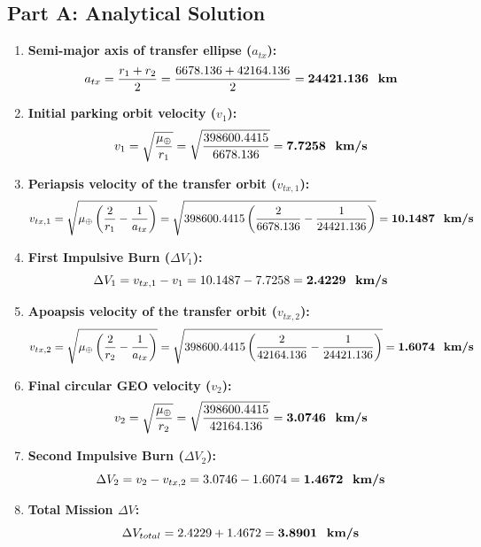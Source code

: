\documentclass[12pt]{article}
\begin{document}
\subsection*{Part A: Analytical Solution}
\begin{enumerate}
    \item \textbf{Semi-major axis of transfer ellipse ($a_{tx}$):}
    \begin{equation*}
        a_{tx} = \frac{r_1 + r_2}{2} = \frac{6678.136 + 42164.136}{2} = \textbf{24421.136 \text{ km}}
    \end{equation*}

    \item \textbf{Initial parking orbit velocity ($v_1$):}
    \begin{equation*}
        v_1 = \sqrt{\frac{\mu_{\oplus}}{r_1}} = \sqrt{\frac{398600.4415}{6678.136}} = \textbf{7.7258 \text{ km/s}}
    \end{equation*}

    \item \textbf{Periapsis velocity of the transfer orbit ($v_{tx,1}$):}
    \begin{equation*}
        v_{tx,1} = \sqrt{\mu_{\oplus} \left( \frac{2}{r_1} - \frac{1}{a_{tx}} \right)} = \sqrt{398600.4415 \left( \frac{2}{6678.136} - \frac{1}{24421.136} \right)} = \textbf{10.1487 \text{ km/s}}
    \end{equation*}

    \item \textbf{First Impulsive Burn ($\Delta V_1$):}
    \begin{equation*}
        \Delta V_1 = v_{tx,1} - v_1 = 10.1487 - 7.7258 = \textbf{2.4229 \text{ km/s}}
    \end{equation*}

    \item \textbf{Apoapsis velocity of the transfer orbit ($v_{tx,2}$):}
    \begin{equation*}
        v_{tx,2} = \sqrt{\mu_{\oplus} \left( \frac{2}{r_2} - \frac{1}{a_{tx}} \right)} = \sqrt{398600.4415 \left( \frac{2}{42164.136} - \frac{1}{24421.136} \right)} = \textbf{1.6074 \text{ km/s}}
    \end{equation*}

    \item \textbf{Final circular GEO velocity ($v_2$):}
    \begin{equation*}
        v_2 = \sqrt{\frac{\mu_{\oplus}}{r_2}} = \sqrt{\frac{398600.4415}{42164.136}} = \textbf{3.0746 \text{ km/s}}
    \end{equation*}

    \item \textbf{Second Impulsive Burn ($\Delta V_2$):}
    \begin{equation*}
        \Delta V_2 = v_2 - v_{tx,2} = 3.0746 - 1.6074 = \textbf{1.4672 \text{ km/s}}
    \end{equation*}

    \item \textbf{Total Mission $\Delta V$:}
    \begin{equation*}
        \Delta V_{total} = 2.4229 + 1.4672 = \textbf{3.8901 \text{ km/s}}
    \end{equation*}
\end{enumerate}
\end{document}
